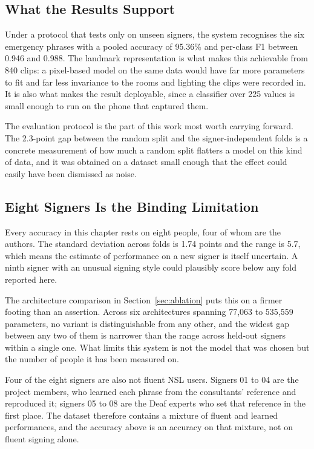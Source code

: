 \subsection{What the Results Support}

Under a protocol that tests only on unseen signers, the system recognises the six emergency phrases with a pooled accuracy of 95.36\% and per-class F1 between 0.946 and 0.988. The landmark representation is what makes this achievable from 840 clips: a pixel-based model on the same data would have far more parameters to fit and far less invariance to the rooms and lighting the clips were recorded in. It is also what makes the result deployable, since a classifier over 225 values is small enough to run on the phone that captured them.

The evaluation protocol is the part of this work most worth carrying forward. The 2.3-point gap between the random split and the signer-independent folds is a concrete measurement of how much a random split flatters a model on this kind of data, and it was obtained on a dataset small enough that the effect could easily have been dismissed as noise.

\subsection{Eight Signers Is the Binding Limitation}

Every accuracy in this chapter rests on eight people, four of whom are the authors. The standard deviation across folds is 1.74 points and the range is 5.7, which means the estimate of performance on a new signer is itself uncertain. A ninth signer with an unusual signing style could plausibly score below any fold reported here.

The architecture comparison in Section~\ref{sec:ablation} puts this on a firmer footing than an assertion. Across six architectures spanning 77{,}063 to 535{,}559 parameters, no variant is distinguishable from any other, and the widest gap between any two of them is narrower than the range across held-out signers within a single one. What limits this system is not the model that was chosen but the number of people it has been measured on.

Four of the eight signers are also not fluent NSL users. Signers 01 to 04 are the project members, who learned each phrase from the consultants' reference and reproduced it; signers 05 to 08 are the Deaf experts who set that reference in the first place. The dataset therefore contains a mixture of fluent and learned performances, and the accuracy above is an accuracy on that mixture, not on fluent signing alone.

